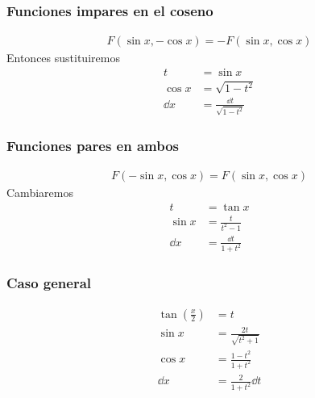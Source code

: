 \documentclass{article}
\begin{document}
\subsubsection{Funciones impares en el coseno}
\begin{equation}
    \begin{split}
        F(\sin x, -\cos x) = -F(\sin x, \cos x)
    \end{split}
\end{equation}
Entonces sustituiremos
\begin{equation}
    \begin{split}
        t &= \sin x\\
        \cos x &= \sqrt{1-t^{2}}\\
        \dd{x} &= \frac{ \dd{t}}{\sqrt{1-t^{2}}}
    \end{split}
\end{equation}
\subsubsection{Funciones pares en ambos}
\begin{equation}
    \begin{split}
        F(-\sin x, \cos x) = F(\sin x, \cos x)
    \end{split}
\end{equation}
Cambiaremos
\begin{equation}
    \begin{split}
        t &= \tan x \\
        \sin x &= \frac{t}{t^{2}-1}\\
        \dd{x} &= \frac{ \dd{t}}{1+t^{2}}
    \end{split}
\end{equation}
\subsubsection{Caso general}
\begin{equation}
    \begin{split}
        \tan (\frac{x}{2}) &= t\\
        \sin x &= \frac{2t}{\sqrt{t^{2}+1}}\\
        \cos x &= \frac{1-t^{2}}{1+t^{2}}\\
        \dd{x} &= \frac{2}{1+t^{2}} \dd{t}
    \end{split}
\end{equation}
\end{document}
